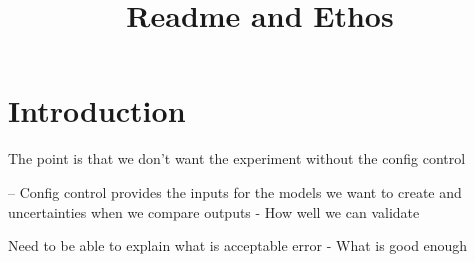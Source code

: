 \documentclass{article}
\title{Readme and Ethos}
\begin{document}
\maketitle

\section{Introduction}

The point is that we don't want the experiment without the config control


--\> Config control provides the inputs for the models we want to create and uncertainties when we compare outputs
- How well we can validate

Need to be able to explain what is acceptable error
- What is good enough
\end{document}
